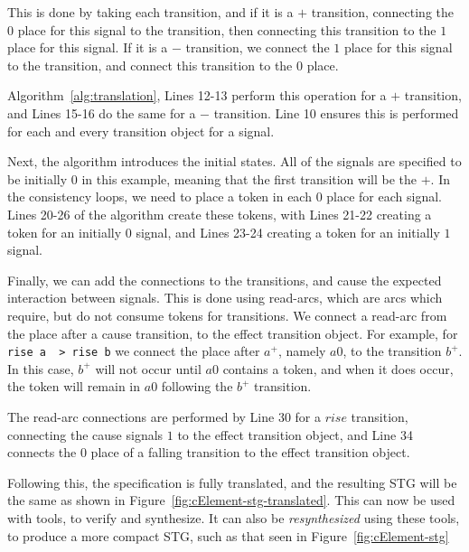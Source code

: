 \documentclass[british,conference,compsoc]{IEEEtran}
\begin{document}
This is done by taking each transition, and if it is a $+$ transition, 
connecting the $0$ place for this signal to the transition, then connecting 
this transition to the $1$ place for this signal. If it is a $-$ 
transition, we connect the $1$ place for this signal to the transition, and 
connect this transition to the $0$ place.

Algorithm~\ref{alg:translation}, Lines 12-13 perform this operation for a $+$ transition,
and Lines 15-16 do the same for a $-$ transition. Line 10 ensures this is performed for 
each and every transition object for a signal.


Next, the algorithm introduces the initial states. All of the signals are 
specified to be initially 0 in this example, meaning that the first transition will be the $+$.
In the consistency loops, we need to place a token 
in each $0$ place for each signal. Lines 20-26 of the algorithm create these tokens,
with Lines 21-22 creating a token for an initially $0$ signal, and Lines 23-24 
creating a token for an initially $1$ signal. 

Finally, we can add the connections to the transitions, and cause the 
expected interaction between signals. This is done using read-arcs, which 
are arcs which require, but do not consume tokens for transitions. We
connect a read-arc from the place after a cause transition, to the effect transition object. 
For example, for \texttt{rise a ~> rise b} we connect the place after $a^{+}$, namely $a0$,
to the transition $b^{+}$. In this case, $b^{+}$ will not occur until $a0$ contains a token,
and when it does occur, the token will remain in $a0$ following the $b^{+}$ transition. 

The read-arc connections are performed by Line 30 for a $rise$ transition, connecting the
cause signals $1$ to the effect transition object, and Line 34 connects the $0$ place of a 
falling transition to the effect transition object. 

Following this, the specification is fully translated, and the resulting STG 
will be the same as shown in Figure~\ref{fig:cElement-stg-translated}. 
This can now be used with tools, to verify and synthesize. It can also be
\emph{resynthesized} using these tools, to produce a more compact STG,
such as that seen in Figure~\ref{fig:cElement-stg}
\end{document}
